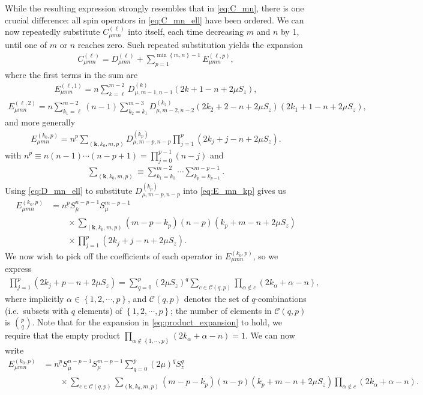 \documentclass[aps,notitlepage,nofootinbib,11pt]{revtex4-1}
\newcommand{\p}[1]{\left(#1\right)} %
\renewcommand{\set}[1]{\left\{#1\right\}} %
\renewcommand{\v}{\bm} %
\newcommand{\C}{\mathcal{C}}
\newcommand{\bmu}{{\bar\mu}}
\newcommand{\1}{\mathds{1}}
\begin{document}
While the resulting expression strongly resembles that in
\eqref{eq:C_mn}, there is one crucial difference: all spin operators
in \eqref{eq:C_mn_ell} have been ordered.  We can now repeatedly
substitute $C_{\mu mn}^{(\ell)}$ into itself, each time decreasing $m$
and $n$ by 1, until one of $m$ or $n$ reaches zero.  Such repeated
substitution yields the expansion
\begin{align}
  C_{\mu mn}^{(\ell)}
  = D_{\mu mn}^{(\ell)}
  + \sum_{p=1}^{\min\set{m,n}-1} E_{\mu mn}^{(\ell,p)},
\end{align}
where the first terms in the sum are
\begin{align}
  E_{\mu mn}^{(\ell,1)}
  = n \sum_{k=\ell}^{m-2} D_{\mu,m-1,n-1}^{(k)}
  \p{2k+1-n+2\mu S_z},
\end{align}
\begin{align}
  E_{\mu mn}^{(\ell,2)}
  = n \sum_{k_1=\ell}^{m-2} \p{n-1} \sum_{k_2=k_1}^{m-3}
  D_{\mu,m-2,n-2}^{(k_2)}
  \p{2k_2+2-n+2\mu S_z} \p{2k_1+1-n+2\mu S_z},
\end{align}
and more generally
\begin{align}
  E_{\mu mn}^{(k_0,p)}
  = n^{\underline{p}} \sum_{\p{\v k,k_0,m,p}}
  D_{\mu,m-p,n-p}^{(k_p)} \prod_{j=1}^p \p{2k_j+j-n+2\mu S_z}.
  \label{eq:E_mn_kp}
\end{align}
with
$n^{\underline{p}}\equiv
n\p{n-1}\cdots\p{n-p+1}=\prod_{j=0}^{p-1}\p{n-j}$ and
\begin{align}
  \sum_{\p{\v k,k_0,m,p}}
  \equiv \sum_{k_1=k_0}^{m-2} \cdots \sum_{k_p=k_{p-1}}^{m-p-1}.
\end{align}
Using \eqref{eq:D_mn_ell} to substitute $D_{\mu,m-p,n-p}^{(k_p)}$ into
\eqref{eq:E_mn_kp} gives us
\begin{align}
  E_{\mu mn}^{(k_0,p)}
  &= n^{\underline{p}} S_\bmu^{n-p-1} S_\mu^{m-p-1} \tag*{} \\
  &\qquad \times \sum_{\p{\v k,k_0,m,p}}
  \p{m-p-k_p} \p{n-p} \p{k_p+m-n+2\mu S_z} \tag*{} \\
  &\qquad \times \prod_{j=1}^p \p{2k_j+j-n+2\mu S_z}.
\end{align}
We now wish to pick off the coefficients of each operator in
$E_{\mu mn}^{\p{k_0,p}}$, so we express
\begin{align}
  \prod_{j=1}^p \p{2k_j+p-n+2\mu S_z}
  = \sum_{q=0}^p \p{2\mu S_z}^q
  \sum_{c\in\C\p{q,p}} \prod_{\alpha\notin c} \p{2k_\alpha+\alpha-n},
  \label{eq:product_expansion}
\end{align}
where implicitly $\alpha\in\set{1,2,\cdots,p}$, and $\C\p{q,p}$
denotes the set of $q$-combinations (i.e.~subsets with $q$ elements)
of $\set{1,2,\cdots,p}$; the number of elements in $\C\p{q,p}$ is
${p \choose q}$.  Note that for the expansion in
\eqref{eq:product_expansion} to hold, we require that the empty
product
$\prod_{\alpha\notin\set{1,\cdots,p}}\p{2k_\alpha+\alpha-n}=1$.  We
can now write
\begin{align}
  E_{\mu mn}^{\p{k_0,p}}
  &= n^{\underline{p}} S_\bmu^{n-p-1} S_\mu^{m-p-1}
  \sum_{q=0}^p \p{2\mu}^q S_z^q \tag*{} \\
  &\qquad \times \sum_{c\in\C\p{q,p}} \sum_{\p{\v k,k_0,m,p}}
  \p{m-p-k_p} \p{n-p} \p{k_p+m-n+2\mu S_z}
  \prod_{\alpha\notin c} \p{2k_\alpha+\alpha-n}.
\end{align}
\end{document}
